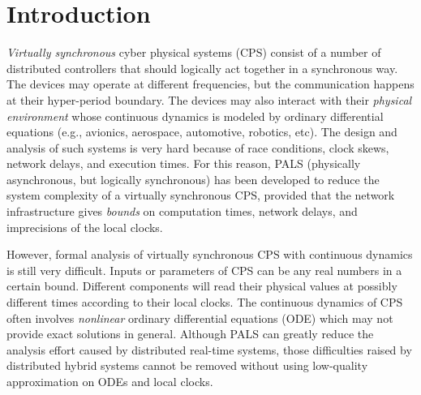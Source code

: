 

\section{Introduction}


\emph{Virtually synchronous} cyber physical systems (CPS)
consist of a number of distributed controllers that should logically act together in a synchronous way. 
The devices may operate at different frequencies, but the communication happens at their hyper-period boundary.
The devices %
may also interact with their %
\emph{physical environment}
whose continuous dynamics is modeled by ordinary differential equations
(e.g., avionics, aerospace,  automotive, robotics, etc). 
The design and analysis of such systems is very hard because of race conditions, clock skews, network delays, and execution times. %
For this reason, 
PALS (physically asynchronous, but logically synchronous) 
\cite{pals-rtss09,mr-pals-journal,pals-tcs,al2012pattern} has been
developed to reduce the system complexity of a virtually  synchronous CPS,
provided that the network infrastructure gives \emph{bounds}
on computation times, network delays, and imprecisions of the local clocks.


However, 
formal analysis of virtually synchronous CPS with continuous dynamics is still very difficult.
Inputs or parameters of CPS can be any real numbers in a certain bound.
Different components will read their physical values at possibly different times 
according to their local clocks. 
The continuous dynamics of CPS often involves 
\emph{nonlinear} ordinary differential equations (ODE)
which may not provide exact solutions in general.
Although %
PALS %
can greatly reduce the analysis effort 
caused by distributed real-time systems,
those difficulties raised by distributed hybrid systems
cannot be removed without using low-quality approximation on ODEs and local clocks.



